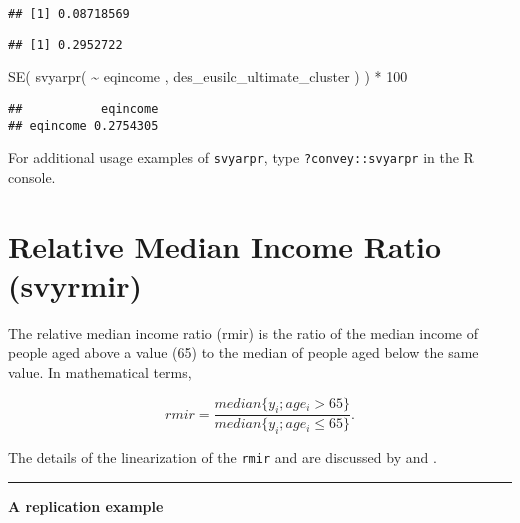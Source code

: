\documentclass[
]{book}
\newenvironment{Shaded}{\begin{snugshade}}{\end{snugshade}}
\newcommand{\CommentTok}[1]{\textcolor[rgb]{0.56,0.35,0.01}{\textit{#1}}}
\newcommand{\DecValTok}[1]{\textcolor[rgb]{0.00,0.00,0.81}{#1}}
\newcommand{\FunctionTok}[1]{\textcolor[rgb]{0.00,0.00,0.00}{#1}}
\newcommand{\NormalTok}[1]{#1}
\newcommand{\SpecialCharTok}[1]{\textcolor[rgb]{0.00,0.00,0.00}{#1}}
\begin{document}
\begin{verbatim}
## [1] 0.08718569
\end{verbatim}

\begin{Shaded}
\end{Shaded}

\begin{verbatim}
## [1] 0.2952722
\end{verbatim}

\begin{Shaded}
\begin{Highlighting}[]
\FunctionTok{SE}\NormalTok{( }\FunctionTok{svyarpr}\NormalTok{( }\SpecialCharTok{\textasciitilde{}}\NormalTok{ eqincome , des\_eusilc\_ultimate\_cluster ) ) }\SpecialCharTok{*} \DecValTok{100}
\end{Highlighting}
\end{Shaded}

\begin{verbatim}
##           eqincome
## eqincome 0.2754305
\end{verbatim}

For additional usage examples of \texttt{svyarpr}, type \texttt{?convey::svyarpr} in the R console.

\hypertarget{relative-median-income-ratio-svyrmir}{%
\section{Relative Median Income Ratio (svyrmir)}\label{relative-median-income-ratio-svyrmir}}

The relative median income ratio (rmir) is the ratio of the median income of people aged above a value (65) to the median of people aged below the same value. In mathematical terms,

\[
rmir = \frac{median\{y_i; age_i >65 \}}{median\{y_i; age_i \leq 65 \}}.
\]

The details of the linearization of the \texttt{rmir} and are discussed by \textcite{deville1999} and \textcite{osier2009}.

\begin{center}\rule{0.5\linewidth}{0.5pt}\end{center}

\textbf{A replication example}
\end{document}
